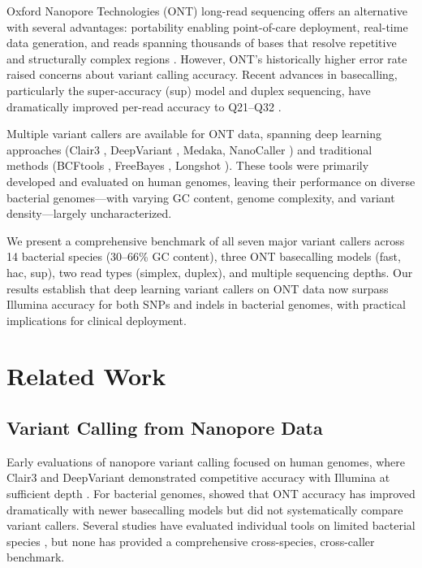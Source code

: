 \documentclass[11pt]{article}
\begin{document}
Oxford Nanopore Technologies (ONT) long-read sequencing offers an alternative with several advantages: portability enabling point-of-care deployment, real-time data generation, and reads spanning thousands of bases that resolve repetitive and structurally complex regions \citep{wang2021}. However, ONT's historically higher error rate raised concerns about variant calling accuracy. Recent advances in basecalling, particularly the super-accuracy (sup) model and duplex sequencing, have dramatically improved per-read accuracy to Q21--Q32 \citep{wick2023}.

Multiple variant callers are available for ONT data, spanning deep learning approaches (Clair3 \citep{zheng2022}, DeepVariant \citep{poplin2018}, Medaka, NanoCaller \citep{ahsan2021}) and traditional methods (BCFtools \citep{danecek2021}, FreeBayes \citep{garrison2012}, Longshot \citep{edge2019}). These tools were primarily developed and evaluated on human genomes, leaving their performance on diverse bacterial genomes---with varying GC content, genome complexity, and variant density---largely uncharacterized.

We present a comprehensive benchmark of all seven major variant callers across 14 bacterial species (30--66\% GC content), three ONT basecalling models (fast, hac, sup), two read types (simplex, duplex), and multiple sequencing depths. Our results establish that deep learning variant callers on ONT data now surpass Illumina accuracy for both SNPs and indels in bacterial genomes, with practical implications for clinical deployment.

\section{Related Work}

\subsection{Variant Calling from Nanopore Data}

Early evaluations of nanopore variant calling focused on human genomes, where Clair3 and DeepVariant demonstrated competitive accuracy with Illumina at sufficient depth \citep{zheng2022,shafin2020}. For bacterial genomes, \citet{wick2023} showed that ONT accuracy has improved dramatically with newer basecalling models but did not systematically compare variant callers. Several studies have evaluated individual tools on limited bacterial species \citep{sanderson2022}, but none has provided a comprehensive cross-species, cross-caller benchmark.
\end{document}
